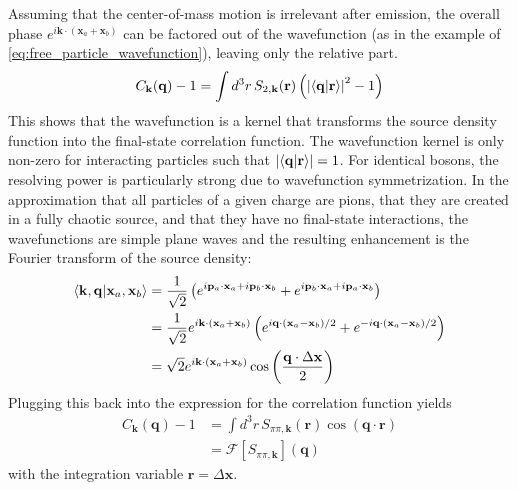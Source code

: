 Assuming that the center-of-mass motion is irrelevant after emission, the overall phase $e^{i\mathbf{k}\cdot(\mathbf{x}_a+\mathbf{x}_b)}$ can be factored out of the wavefunction (as in the example of \cref{eq:free_particle_wavefunction}), leaving only the relative part.
\begin{equation} \label{eq:wavefunction_kernel}
C_\mathbf{k}(\mathbf{q}) - 1 = \int d^3 r \, S_{2,\mathbf{k}}(\mathbf{r}) \left(\left|\braket{\mathbf{q}|\mathbf{r}}\right|^2 - 1 \right)
\end{equation}
This shows that the wavefunction is a kernel that transforms the source density function into the final-state correlation function.
The wavefunction kernel is only non-zero for interacting particles such that $\left|\braket{\mathbf{q}|\mathbf{r}}\right| = 1$.
For identical bosons, the resolving power is particularly strong due to wavefunction symmetrization.
In the approximation that all particles of a given charge are pions, that they are created in a fully chaotic source, and that they have no final-state interactions, the wavefunctions are simple plane waves and the resulting enhancement is the Fourier transform of the source density:
\begin{equation}
  \begin{split}
    \label{eq:free_particle_wavefunction}
\braket{\mathbf{k},\mathbf{q} | \mathbf{x}_a,\mathbf{x}_b} &= \frac{1}{\sqrt{2}}\left(e^{i\mathbf{p}_a \cdot \mathbf{x}_a + i\mathbf{p}_b \cdot \mathbf{x}_b} + e^{i\mathbf{p}_b \cdot \mathbf{x}_a + i\mathbf{p}_a \cdot \mathbf{x}_b}\right)\\
&= \frac{1}{\sqrt{2}} e^{i\mathbf{k} \cdot (\mathbf{x}_a+ \mathbf{x}_b)}\left(e^{i\mathbf{q} \cdot (\mathbf{x}_a - \mathbf{x}_b)/2} + e^{- i\mathbf{q} \cdot (\mathbf{x}_a - \mathbf{x}_b)/2}\right)\\
&= \sqrt{2}  e^{i\mathbf{k} \cdot (\mathbf{x}_a+ \mathbf{x}_b)} \cos\left( \frac{\mathbf{q} \cdot \Delta\mathbf{x}}{2} \right)\\
  \end{split}
\end{equation}
Plugging this back into the expression for the correlation function yields
\begin{equation}
  \begin{split}
C_{\mathbf{k}}(\mathbf{q}) - 1 &= \int d^3 r \, S_{\pi\pi,\mathbf{k}}(\mathbf{r}) \cos\left(\mathbf{q}\cdot\mathbf{r}\right)
\\&= \mathcal{F}\left[{S}_{\pi\pi,\mathbf{k}}\right] (\mathbf{q})
  \end{split}
\end{equation}
with the integration variable $\mathbf{r} = \Delta\mathbf{x}$.

